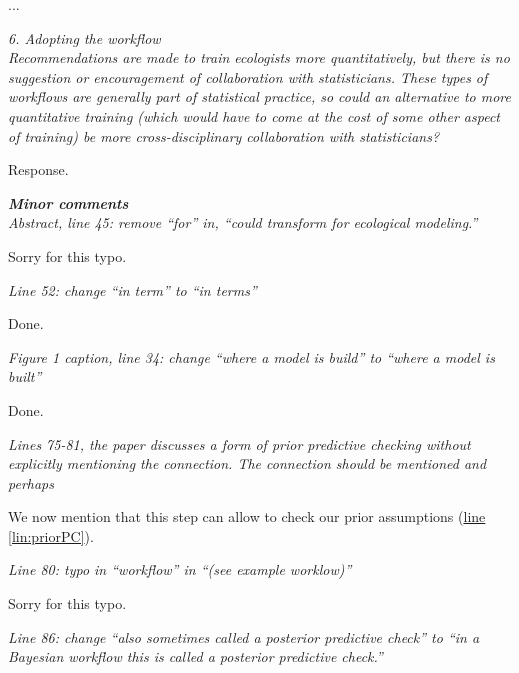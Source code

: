 \documentclass[11pt,letter]{article}
\begin{document}
...

\begin{mybox}
\emph{6. Adopting the workflow\\
Recommendations are made to train ecologists more quantitatively, but there is no suggestion or encouragement of collaboration with statisticians. These types of workflows are generally part of statistical practice, so could an alternative to more quantitative training (which would have to come at the cost of some other aspect of training) be more cross-disciplinary collaboration with statisticians?}
\end{mybox}

Response.

\begin{mybox}
\emph{\textbf{Minor comments}\\
Abstract, line 45: remove “for” in, “could transform for ecological modeling.”}
\end{mybox}

Sorry for this typo.

\begin{mybox}
\emph{Line 52: change “in term” to “in terms”}
\end{mybox}

Done.

\begin{mybox}
\emph{Figure 1 caption, line 34: change “where a model is build” to “where a model is built”}
\end{mybox}

Done.

\begin{mybox}
\emph{Lines 75-81, the paper discusses a form of prior predictive checking without explicitly mentioning the connection. The connection should be mentioned and perhaps}
\end{mybox}

We now mention that this step can allow to check our prior assumptions (\href{file:forecastflows_r1\#lintarget:priorPC}{line \ref*{lin:priorPC}}).

\begin{mybox}
\emph{Line 80: typo in “workflow” in “(see example worklow)”}
\end{mybox}

Sorry for this typo.

\begin{mybox}
\emph{Line 86: change “also sometimes called a posterior predictive check” to “in a Bayesian workflow this is called a posterior predictive check.”}
\end{mybox}
\end{document}
